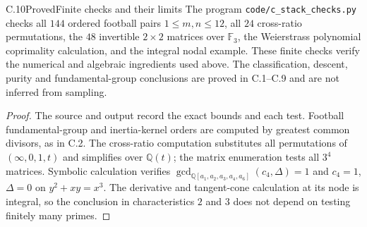 \begin{statement}{C.10}{Proved}{Finite checks and their limits}
The program \texttt{code/c\_stack\_checks.py} checks all
$144$ ordered football pairs $1\leq m,n\leq12$, all $24$
cross-ratio permutations, the $48$ invertible $2\times2$
matrices over $\mathbb F_3$, the Weierstrass polynomial
coprimality calculation, and the integral nodal example.
These finite checks verify the numerical and algebraic
ingredients used above. The classification, descent,
purity and fundamental-group conclusions are proved in
C.1--C.9 and are not inferred from sampling.
\end{statement}
\begin{proof}
The source and output record the exact bounds and each
test. Football fundamental-group and inertia-kernel
orders are computed by greatest common divisors, as in
C.2. The cross-ratio computation substitutes all
permutations of $(\infty,0,1,t)$ and simplifies over
$\mathbb Q(t)$; the matrix enumeration tests all $3^4$
matrices. Symbolic calculation verifies
$\gcd_{\mathbb Q[a_1,a_2,a_3,a_4,a_6]}(c_4,\Delta)=1$
and $c_4=1$, $\Delta=0$ on $y^2+xy=x^3$.
The derivative and tangent-cone calculation at its node
is integral, so the conclusion in characteristics $2$
and $3$ does not depend on testing finitely many primes.
\end{proof}

